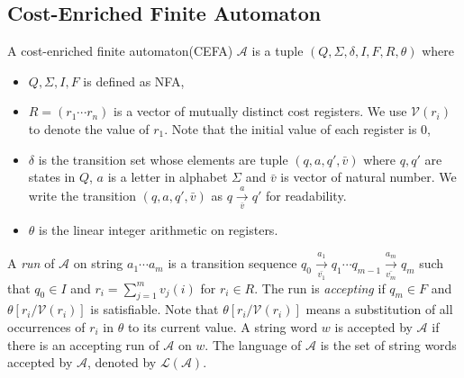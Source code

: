 \documentclass[sigconf]{acmart}
\newcommand*{\lan}{\mathcal{L}}
\newcommand*{\aut}{\mathcal{A}}
\begin{document}
\subsection{Cost-Enriched Finite Automaton}
\begin{definition}
  A cost-enriched finite automaton(CEFA) $\aut$ is a tuple $(Q, \Sigma, \delta, I, F, R, \theta)$ where
  \begin{itemize}
    \item $Q,\Sigma,I,F$ is defined as NFA,
    \item $R = (r_1\cdots r_n)$ is a vector of mutually distinct cost registers. We use $\mathcal{V}(r_i)$ to denote the value of $r_1$. Note that the initial value of each register is 0,
    \item $\delta$ is the transition set whose elements are tuple $(q, a, q', \bar{v})$ where $q, q'$ are states in $Q$, $a$ is a letter in alphabet $\Sigma$ and $\bar{v}$ is vector of natural number. We write the transition $(q, a, q', \bar{v})$ as $q\xrightarrow[\bar{v}]{a} q'$ for readability.
    \item $\theta$ is the linear integer arithmetic on registers.
  \end{itemize}
  A \emph{run} of $\aut$ on string $a_1\cdots a_m$ is a transition sequence $q_0\xrightarrow[\bar{v_1}]{a_1}q_1\cdots q_{m-1}\xrightarrow[\bar{v_m}]{a_m}q_m$ such that $q_0\in I$ and $r_i = \displaystyle\sum_{j=1}^m v_j(i)$ for $r_i \in R$. The run is \emph{accepting} if $q_m\in F$ and $\theta[r_i/\mathcal{V}(r_i)]$ is satisfiable. Note that $\theta[r_i/\mathcal{V}(r_i)]$ means a substitution of all occurrences of $r_i$ in $\theta$ to its current value. A string word $w$ is accepted by $\aut$ if there is an accepting run of $\aut$ on $w$. The language of $\aut$ is the set of string words accepted by $\aut$, denoted by $\lan(\aut)$.
\end{definition}
\end{document}
